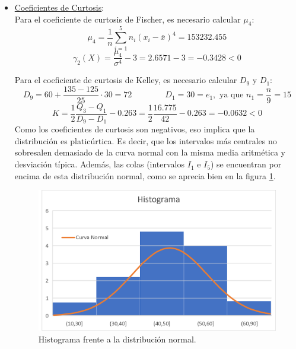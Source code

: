 \begin{ejercicio}
\begin{enumerate}
\begin{itemize}
            \item \underline{Coeficientes de Curtosis}:\\
            Para el coeficiente de curtosis de Fischer, es necesario calcular $\mu_4$:
            $$\mu_4 = \frac{1}{n}\sum_{i=1}^5n_i(x_i-\bar{x})^4 = 153232.455$$
            $$\gamma_2(X) = \frac{\mu_4}{\sigma^4} -3 = 2.6571-3 = -0.3428 < 0$$
            
            Para el coeficiente de curtosis de Kelley, es necesario calcular $D_9$ y $D_1$:
            $$D_{9} = 60 + \frac{135-125}{25}\cdot 30 = 72
            \qquad \qquad
            D_{1} = 30 = e_1,\text{ ya que } n_1 = \frac{n}{9}=15$$
            $$K=\frac{1}{2}\frac{Q_3-Q_1}{D_9-D_1}-0.263 =
            \frac{1}{2}\frac{16.775}{42}-0.263 = -0.0632 < 0$$
            Como los coeficientes de curtosis son negativos, eso implica que la distribución es platicúrtica. Es decir, que los intervalos más centrales no sobresalen demasiado de la curva normal con la misma media aritmética y desviación típica. Además, las colas (intervalos $I_1$ e $I_5$) se encuentran por encima de esta distribución normal, como se aprecia bien en la figura \ref{fig:Ej10.Curtosis}.
            \begin{figure}[H]
                \centering
                \includegraphics[width=0.8\linewidth]{Imagenes/Ej10.Curtosis.png}
                \caption{Histograma frente a la distribución normal.}
                \label{fig:Ej10.Curtosis}
            \end{figure}
        \end{itemize}
    \end{enumerate}
\end{ejercicio}
